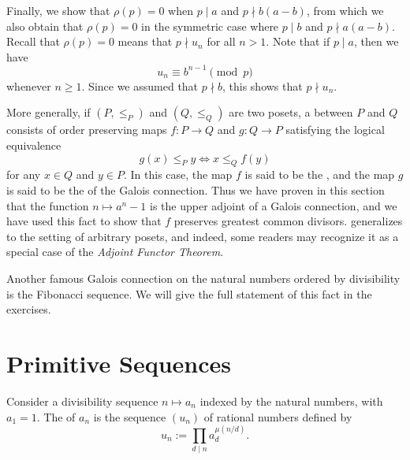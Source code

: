 \begin{example}
  Finally, we show that $\rho(p)=0$ when $p\mid a$ and $p\nmid b(a-b)$, from which we also obtain that $\rho(p)=0$ in the symmetric case where $p\mid b$ and $p\nmid a(a-b)$. Recall that $\rho(p)=0$ means that $p\nmid u_n$ for all $n>1$. Note that if $p\mid a$, then we have
  \begin{equation*}
    u_n\equiv b^{n-1}\pmod{p}
  \end{equation*}
  whenever $n\geq 1$. Since we assumed that $p\nmid b$, this shows that $p\nmid u_n$.
\end{example}

\begin{remark}
  More generally, if $(P,\leq_P)$ and $(Q,\leq_Q)$ are two posets, a  between $P$ and $Q$ consists of order preserving maps $f:P\to Q$ and $g:Q\to P$ satisfying the logical equivalence
  \begin{equation*}
    g(x)\leq_P y \Leftrightarrow x\leq_Q f(y)
  \end{equation*}
  for any $x\in Q$ and $y\in P$. In this case, the map $f$ is said to be the , and the map $g$ is said to be the  of the Galois connection. Thus we have proven in this section that the function $n\mapsto a^n-1$ is the upper adjoint of a Galois connection, and we have used this fact to show that $f$ preserves greatest common divisors.  generalizes to the setting of arbitrary posets, and indeed, some readers may recognize it as a special case of the \emph{Adjoint Functor Theorem}.

  Another famous Galois connection on the natural numbers ordered by divisibility is the Fibonacci sequence. We will give the full statement of this fact in the exercises.
\end{remark}

\section{Primitive Sequences}

\begin{definition}
  Consider a divisibility sequence $n\mapsto a_n$ indexed by the natural numbers, with $a_1=1$. The  of $a_n$ is the sequence $(u_n)$ of rational numbers defined by
  \begin{equation*}
    u_n:=\prod_{d\mid n}a_d^{\mu(n/d)}.
  \end{equation*}
\end{definition}

